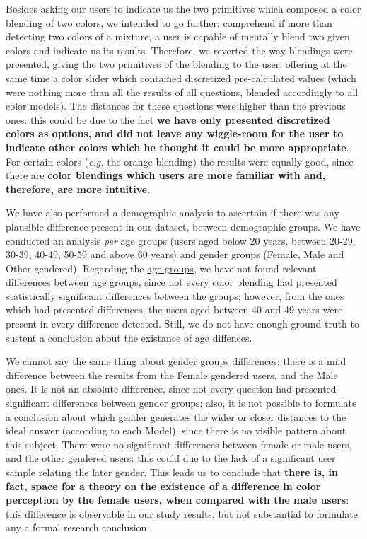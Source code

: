 %
Besides asking our users to indicate us the two primitives which composed a color blending of two colors, we intended to go further: comprehend if more than detecting two colors of a mixture, a user is capable of mentally blend two given colors and indicate us its results.
Therefore, we reverted the way blendings were presented, giving the two primitives of the blending to the user, offering at the same time a color slider which contained discretized pre-calculated values (which were nothing more than all the results of all questions,
blended accordingly to all color models). The distances for these questions were higher than the previous ones: this could be due to the fact \textbf{we have only presented discretized colors as options, and did not leave any wiggle-room for the user to indicate other
colors which he thought it could be more appropriate}. For certain colors (\emph{e.g.} the orange blending) the results were equally good, since there are \textbf{color blendings which users are more familiar with and, therefore, are more intuitive}. \par
%
We have also performed a demographic analysis to ascertain if there was any plausible difference present in our dataset, between demographic groups. We have conducted an analysis \emph{per} age groups (users aged below 20 years, between 20-29, 30-39, 40-49, 50-59 and
above 60 years) and gender groups (Female, Male and Other gendered). Regarding the \ul{age groups}, we have not found relevant differences between age groups, since not every color blending had presented statistically significant differences between the groups; however,
from the ones which had presented differences, the users aged between 40 and 49 years were present in every difference detected. Still, we do not have enough ground truth to sustent a conclusion about the existance of age diffences. \par
%
We cannot say the same thing about \ul{gender groups} differences: there is a mild difference between the results from the Female gendered users, and the Male ones. It is not an absolute difference, since not every question had presented significant differences between
gender groups; also, it is not possible to formulate a conclusion about which gender generates the wider or closer distances to the ideal answer (according to each Model), since there is no visible pattern about this subject. There were no significant differences
between female or male users, and the other gendered users: this could due to the lack of a significant user sample relating the later gender. This leads us to conclude that \textbf{there is, in fact, space for a theory on the existence of a difference in color
perception by the female users, when compared with the male users}: this difference is observable in our study results, but not substantial to formulate any a formal research conclusion. \par

